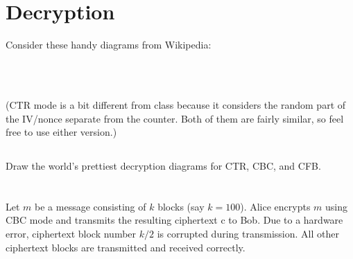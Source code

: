 \documentclass[12pt]{article}
\begin{document}
\section{Decryption}

Consider these handy diagrams from Wikipedia:

\begin{center}
\\
\\
\end{center}

(CTR mode is a bit different from class because it considers the random part of the IV/nonce separate from the counter. Both of them are fairly similar, so feel free to use either version.)

\subsection{}

Draw the world's prettiest decryption diagrams for CTR, CBC, and CFB.


\section{}
Let $m$ be a message consisting of $k$ blocks (say $k = 100$). Alice encrypts $m$
using CBC mode and transmits the resulting ciphertext c to Bob. Due to a hardware error,
ciphertext block number $k/2$ is corrupted during transmission. All other ciphertext blocks
are transmitted and received correctly.
\end{document}
